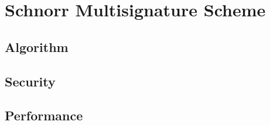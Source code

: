 \chapter{Schnorr Multisignature Scheme}
\section{Algorithm}
\cite{SchnorrMulti}
\section{Security}
\section{Performance}
